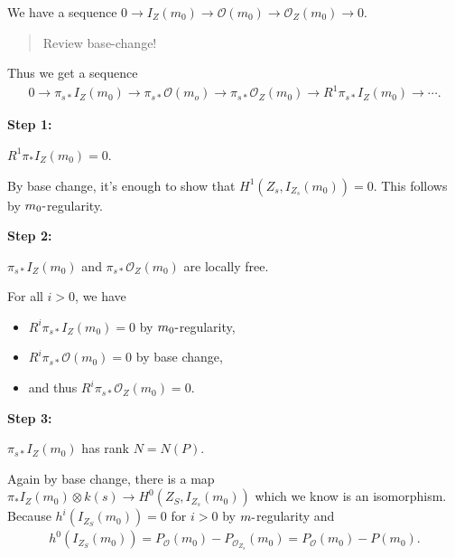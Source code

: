 \begin{center}
\end{center}

We have a sequence
\(0 \to I_Z(m_0) \to {\mathcal{O}}(m_0) \to {\mathcal{O}}_Z(m_0) \to 0\).

\begin{quote}
Review base-change!
\end{quote}

Thus we get a sequence
\begin{align*}
0 \to \pi_{s*}I_Z(m_0) \to \pi_{s*}{\mathcal{O}}(m_o) \to \pi_{s*} {\mathcal{O}}_Z(m_0) \to R^1 \pi_{s*}I_Z(m_0) \to \cdots
.\end{align*}

\textbf{Step 1:}

\(R^1\pi_* I_Z(m_0) = 0\).

By base change, it's enough to show that \(H^1(Z_s, I_{Z_s}(m_0)) = 0\).
This follows by \(m_0{\hbox{-}}\)regularity.

\textbf{Step 2:}

\(\pi_{s*}I_Z(m_0)\) and \(\pi_{s*} {\mathcal{O}}_Z(m_0)\) are locally
free.

For all \(i>0\), we have

\begin{itemize}
\tightlist
\item
  \(R^i \pi_{s*} I_Z(m_0) = 0\) by \(m_0{\hbox{-}}\)regularity,
\item
  \(R^i \pi_{s*} {\mathcal{O}}(m_0) = 0\) by base change,
\item
  and thus \(R^i \pi_{s*} {\mathcal{O}}_Z(m_0) = 0\).
\end{itemize}

\textbf{Step 3:}

\(\pi_{s*}I_Z(m_0)\) has rank \(N = N(P)\).

Again by base change, there is a map
\(\pi_* I_Z(m_0) \otimes k(s) \to H^0(Z_S, I_{Z_s}(m_0))\) which we know
is an isomorphism. Because \(h^i ( I_{Z_S}(m_0) ) = 0\) for \(i>0\) by
\(m{\hbox{-}}\)regularity and
\begin{align*}
h^0(I_{Z_S}(m_0)) = P_{\mathcal{O}}(m_0) - P_{{\mathcal{O}}_{Z_s}}(m_0) = P_{\mathcal{O}}(m_0) - P(m_0)
.\end{align*}

